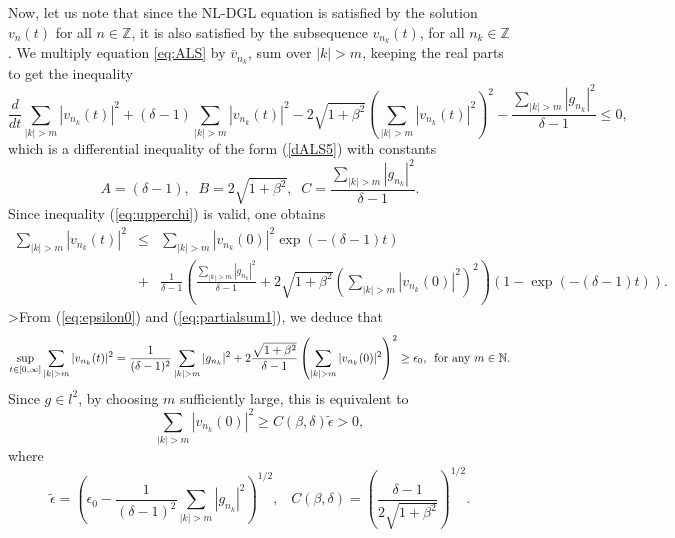 \documentclass[preprintnumbers,amsmath,amssymb]{revtex4}
\begin{document}
Now, let us note that since the NL-DGL equation is satisfied by the solution $v_n(t)$ for all $n\in\mathbb{Z}$, it is also satisfied by the subsequence $v_{n_k}(t)$, for all $n_k\in\mathbb{Z}$. We multiply equation \eqref{eq:ALS} by $\overline{v}_{n_k}$, sum over $|k|>m$, keeping the real parts to get the inequality
\begin{equation}
\label{baltailu}
  \frac{d}{dt}\sum_{|k|>m}|v_{n_k}(t)|^2 +(\delta-1) \sum_{|k|>m}|v_{n_k}(t)|^2 -2\sqrt{1+\beta^2}\left( \sum_{|k|>m}|v_{n_k}(t)|^2\right)^2-\frac{\sum_{|k|>m}|g_{n_k}|^2}{\delta-1}\leq 0,
\end{equation}
which is a differential inequality of the form (\ref{dALS5}) with constants 
\begin{equation*}
A=(\delta-1),\;\;B=2\sqrt{1+\beta^2},\;\;C=\frac{\sum_{|k|>m}|g_{n_k}|^2}{\delta-1}.
\end{equation*}
Since inequality (\ref{eq:upperchi}) is valid, one obtains
\begin{eqnarray}
 \sum_{|k|>m}|v_{n_k}(t)|^2 &\le& \sum_{|k|>m}|v_{n_k}(0)|^2 \exp(-(\delta-1)t)
 \nonumber\\
 &+&\frac{1}{\delta-1}\left(\frac{\sum_{|k|>m} |g_{n_k}|^2}{\delta-1}+2\sqrt{1+\beta^2}\left( \sum_{|k|>m}|v_{n_k}(0)|^2\right)^2
 \right)\left(1-\exp(-(\delta-1)t)\right).\label{eq:partialsum1}
 \end{eqnarray}
>From (\ref{eq:epsilon0}) and (\ref{eq:partialsum1}), we deduce that
 \begin{equation}
  \sup_{t\in[0,\infty]}\sum_{|k|>m}|v_{n_k}(t)|^2 =
  \frac{1}{(\delta-1)^2}\sum_{|k|>m} |g_{n_k}|^2 +2\frac{\sqrt{1+\beta^2}}{\delta-1}
  \left( \sum_{|k|>m}|v_{n_k}(0)|^2\right)^2
  \ge \epsilon_0,\,\,\,{\rm for\,\, any}\,\, m\in {\mathbb{N}}.
 \end{equation}
Since $g\in l^2$, by choosing $m$ sufficiently large,  this is equivalent to
\begin{equation}
 \sum_{|k|>m}|v_{n_k}(0)|^2
  \ge C(\beta,\delta)\tilde{\epsilon}>0,\label{eq:sumvnk}
  \end{equation}
  where 
 \begin{equation}
 \tilde{\epsilon}=\left(\epsilon_0  -
  \frac{1}{(\delta-1)^2}\sum_{|k|>m} |g_{n_k}|^2\right)^{1/2},\,\,\,\,\, C(\beta,\delta)= \left(\frac{\delta-1}{2\sqrt{1+\beta^2}}\right)^{1/2}.
 \end{equation}
 
\end{document}
